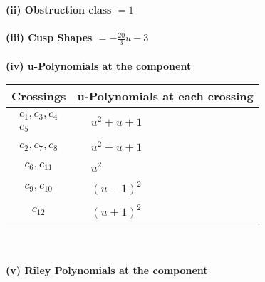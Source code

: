 \documentclass[1p]{elsarticle_modified}
\theoremstyle{definition}
\begin{document}
\flushleft \textbf{(ii) Obstruction class $= 1$}\\~\\
\flushleft \textbf{(iii) Cusp Shapes $= -\frac{20}{3} u-3$}\\~\\
\newpage\renewcommand{\arraystretch}{1}
\flushleft \textbf{(iv) u-Polynomials at the component}\newline \\
\begin{tabular}{m{50pt}|m{274pt}}
Crossings & \hspace{64pt}u-Polynomials at each crossing \\
\hline $$\begin{aligned}c_{1},c_{3},c_{4}\\c_{5}\end{aligned}$$&$\begin{aligned}
&u^2+u+1
\end{aligned}$\\
\hline $$\begin{aligned}c_{2},c_{7},c_{8}\end{aligned}$$&$\begin{aligned}
&u^2- u+1
\end{aligned}$\\
\hline $$\begin{aligned}c_{6},c_{11}\end{aligned}$$&$\begin{aligned}
&u^2
\end{aligned}$\\
\hline $$\begin{aligned}c_{9},c_{10}\end{aligned}$$&$\begin{aligned}
&(u-1)^2
\end{aligned}$\\
\hline $$\begin{aligned}c_{12}\end{aligned}$$&$\begin{aligned}
&(u+1)^2
\end{aligned}$\\
\hline
\end{tabular}\\~\\
\newpage\renewcommand{\arraystretch}{1}
\flushleft \textbf{(v) Riley Polynomials at the component}\newline \\
\end{document}

